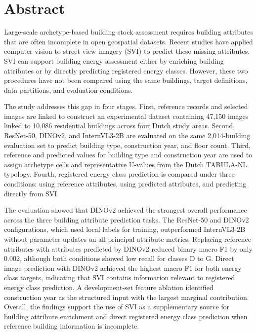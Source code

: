 \section*{Abstract}

Large-scale archetype-based building stock assessment requires building attributes that are often incomplete in open geospatial datasets. Recent studies have applied computer vision to street view imagery (SVI) to predict these missing attributes. SVI can support building energy assessment either by enriching building attributes or by directly predicting registered energy classes. However, these two procedures have not been compared using the same buildings, target definitions, data partitions, and evaluation conditions.

The study addresses this gap in four stages. First, reference records and selected images are linked to construct an experimental dataset containing 47,150 images linked to 10,086 residential buildings across four Dutch study areas. Second, ResNet-50, DINOv2, and InternVL3-2B are evaluated on the same 2,014-building evaluation set to predict building type, construction year, and floor count. Third, reference and predicted values for building type and construction year are used to assign archetype cells and representative U-values from the Dutch TABULA-NL typology. Fourth, registered energy class prediction is compared under three conditions: using reference attributes, using predicted attributes, and predicting directly from SVI.

The evaluation showed that DINOv2 achieved the strongest overall performance across the three building attribute prediction tasks. The ResNet-50 and DINOv2 configurations, which used local labels for training, outperformed InternVL3-2B without parameter updates on all principal attribute metrics. Replacing reference attributes with attributes predicted by DINOv2 reduced binary macro F1 by only 0.002, although both conditions showed low recall for classes D to G. Direct image prediction with DINOv2 achieved the highest macro F1 for both energy class targets, indicating that SVI contains information relevant to registered energy class prediction. A development-set feature ablation identified construction year as the structured input with the largest marginal contribution. Overall, the findings support the use of SVI as a supplementary source for building attribute enrichment and direct registered energy class prediction when reference building information is incomplete.

\newpage
